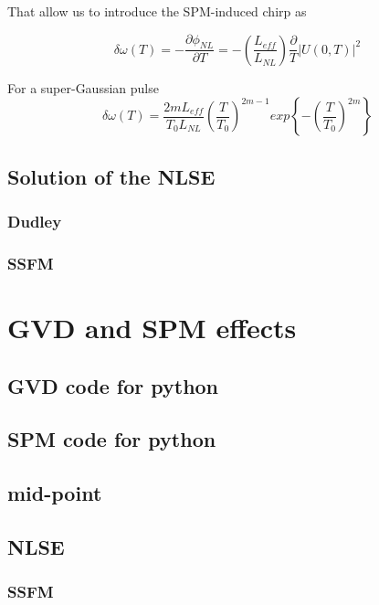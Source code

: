            That allow us to introduce the SPM-induced chirp as
            
            \begin{equation}
                \delta \omega(T) = -\frac{\partial \phi_{NL}}{\partial T} = -\left( \frac{L_{eff}}{L_{NL}} \right) \frac{\partial }{T} |U(0,T)|^2
                \label{deltaomega}
            \end{equation}
        
        
         For a super-Gaussian pulse 
            \begin{equation}
                \delta \omega(T) = \frac{2m L_{eff}}{T_0 L_{NL}}\left( \frac{T}{T_0}\right)^{2m-1}  exp\left\{ -\left( \frac{T}{T_0}\right)^{2m}   \right\}
            \end{equation}
        
        \subsection{Solution of the NLSE}
            \subsubsection{Dudley}
            \subsubsection{SSFM}


\section{GVD and SPM effects}
    \subsection{GVD code for python}
    \subsection{SPM code for python}
        \subsection{mid-point}
    \subsection{NLSE}
        \subsubsection{SSFM}